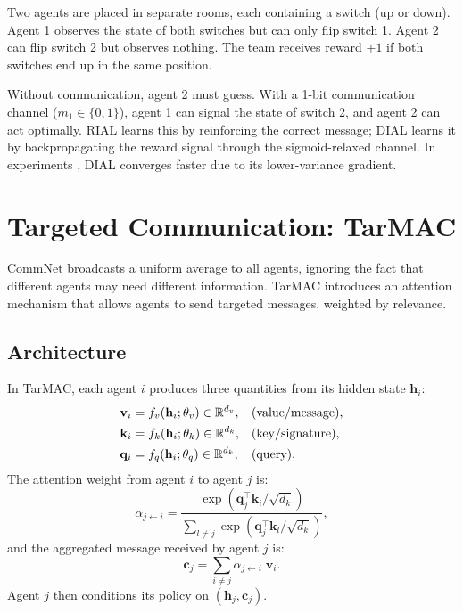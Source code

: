 \documentclass[11pt,a4paper]{article}
\begin{document}
\begin{example}
\label{ex:switch}
Two agents are placed in separate rooms, each containing a switch
(up or down).  Agent 1 observes the state of both switches but
can only flip switch 1.  Agent 2 can flip switch 2 but observes
nothing.  The team receives reward $+1$ if both switches end up
in the same position.

Without communication, agent 2 must guess.  With a 1-bit
communication channel ($m_1 \in \{0,1\}$), agent 1 can signal
the state of switch 2, and agent 2 can act optimally.  RIAL
learns this by reinforcing the correct message; DIAL learns it
by backpropagating the reward signal through the sigmoid-relaxed
channel.  In experiments \citep{foerster2016}, DIAL converges
faster due to its lower-variance gradient.
\end{example}

\section{Targeted Communication: TarMAC}
\label{sec:tarmac}

CommNet broadcasts a uniform average to all agents, ignoring
the fact that different agents may need different information.
TarMAC \citep{das2019} introduces an attention mechanism that
allows agents to send targeted messages, weighted by relevance.

\subsection{Architecture}

\begin{definition}[TarMAC]
\label{def:tarmac}
In TarMAC, each agent $i$ produces three quantities from its
hidden state $\mathbf{h}_i$:
\begin{align}
  \mathbf{v}_i &= f_v(\mathbf{h}_i; \theta_v)
    \in \mathbb{R}^{d_v}, & &\text{(value/message)},
    \label{eq:tarmac-value} \\
  \mathbf{k}_i &= f_k(\mathbf{h}_i; \theta_k)
    \in \mathbb{R}^{d_k}, & &\text{(key/signature)},
    \label{eq:tarmac-key} \\
  \mathbf{q}_i &= f_q(\mathbf{h}_i; \theta_q)
    \in \mathbb{R}^{d_k}, & &\text{(query)}.
    \label{eq:tarmac-query}
\end{align}
The attention weight from agent $i$ to agent $j$ is:
\begin{equation}
  \alpha_{j \leftarrow i} = \frac{\exp(\mathbf{q}_j^\top
  \mathbf{k}_i / \sqrt{d_k})}{\sum_{l \neq j} \exp(
  \mathbf{q}_j^\top \mathbf{k}_l / \sqrt{d_k})},
  \label{eq:tarmac-attention}
\end{equation}
and the aggregated message received by agent $j$ is:
\begin{equation}
  \mathbf{c}_j = \sum_{i \neq j} \alpha_{j \leftarrow i}
  \;\mathbf{v}_i.
  \label{eq:tarmac-message}
\end{equation}
Agent $j$ then conditions its policy on
$(\mathbf{h}_j, \mathbf{c}_j)$.
\end{definition}
\end{document}
